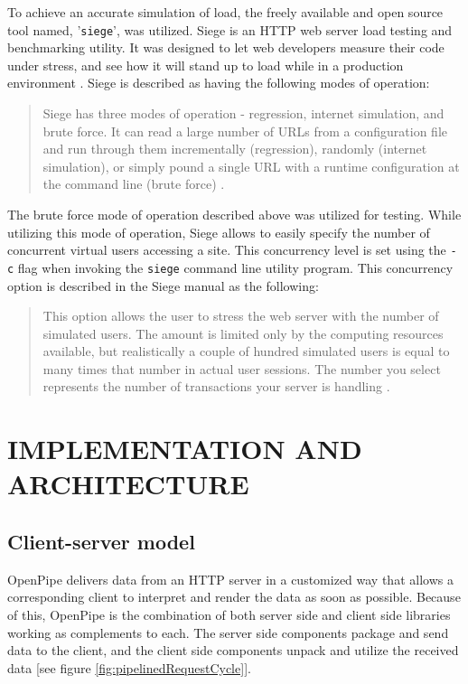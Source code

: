 \documentclass[12pt]{report}
\begin{document}
To achieve an accurate simulation of load, the freely available and open source tool named, '\texttt{siege}', was utilized. Siege is an HTTP web server load testing and benchmarking utility. It was designed to let web developers measure their code under stress, and see how it will stand up to load while in a production environment \cite{SiegeHomepage}. Siege is described as having the following modes of operation:

\begin{quote}
Siege has three modes of operation - regression, internet simulation, and brute force. It can read a large number of URLs from a configuration file and run through them incrementally (regression), randomly (internet simulation), or simply pound a single URL with a runtime configuration at the command line (brute force) \cite{SiegeManual}.
\end{quote}

The brute force mode of operation described above was utilized for testing. While utilizing this mode of operation, Siege allows to easily specify the number of concurrent virtual users accessing a site. This concurrency level is set using the \texttt{-c} flag when invoking the \texttt{siege} command line utility program. This concurrency option is described in the Siege manual as the following:

\begin{quote}
This option allows the user to stress the web server with the number of simulated users. The amount is limited only by the computing resources available, but realistically a couple of hundred simulated users is equal to many times that number in actual user sessions. The number you select represents the number of transactions your server is handling \cite{SiegeManual}.
\end{quote}




\chapter{IMPLEMENTATION AND ARCHITECTURE}

\section{Client-server model}
OpenPipe delivers data from an HTTP server in a customized way that allows a corresponding client to interpret and render the data as soon as possible. Because of this, OpenPipe is the combination of both server side and client side libraries working as complements to each. The server side components package and send data to the client, and the client side components unpack and utilize the received data [see figure \ref{fig:pipelinedRequestCycle}].
\end{document}
